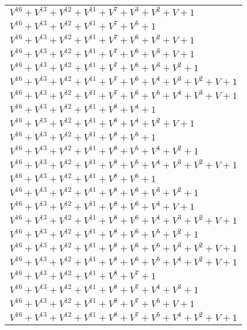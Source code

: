 \documentclass[12pt]{article}
\begin{document}
\begin{adjustwidth}{-4cm}{}
\begin{center}
\begin{longtable}{|l|}
$V^{16}  +V^{13}  +V^{12}  +V^{11}  +V^{7}  +V^{3}  +V^{2}  + V + 1$ \\
$V^{16}  +V^{13}  +V^{12}  +V^{11}  +V^{7}  +V^{5}  + 1$ \\
$V^{16}  +V^{13}  +V^{12}  +V^{11}  +V^{7}  +V^{6}  +V^{2}  + V + 1$ \\
$V^{16}  +V^{13}  +V^{12}  +V^{11}  +V^{7}  +V^{6}  +V^{3}  + V + 1$ \\
$V^{16}  +V^{13}  +V^{12}  +V^{11}  +V^{7}  +V^{6}  +V^{3}  +V^{2}  + 1$ \\
$V^{16}  +V^{13}  +V^{12}  +V^{11}  +V^{7}  +V^{6}  +V^{4}  +V^{3}  +V^{2}  + V + 1$ \\
$V^{16}  +V^{13}  +V^{12}  +V^{11}  +V^{7}  +V^{6}  +V^{5}  +V^{4}  +V^{3}  + V + 1$ \\
$V^{16}  +V^{13}  +V^{12}  +V^{11}  +V^{8}  +V^{4}  + 1$ \\
$V^{16}  +V^{13}  +V^{12}  +V^{11}  +V^{8}  +V^{4}  +V^{2}  + V + 1$ \\
$V^{16}  +V^{13}  +V^{12}  +V^{11}  +V^{8}  +V^{5}  + 1$ \\
$V^{16}  +V^{13}  +V^{12}  +V^{11}  +V^{8}  +V^{5}  +V^{4}  +V^{2}  + 1$ \\
$V^{16}  +V^{13}  +V^{12}  +V^{11}  +V^{8}  +V^{5}  +V^{4}  +V^{3}  +V^{2}  + V + 1$ \\
$V^{16}  +V^{13}  +V^{12}  +V^{11}  +V^{8}  +V^{6}  + 1$ \\
$V^{16}  +V^{13}  +V^{12}  +V^{11}  +V^{8}  +V^{6}  +V^{3}  +V^{2}  + 1$ \\
$V^{16}  +V^{13}  +V^{12}  +V^{11}  +V^{8}  +V^{6}  +V^{4}  + V + 1$ \\
$V^{16}  +V^{13}  +V^{12}  +V^{11}  +V^{8}  +V^{6}  +V^{4}  +V^{3}  +V^{2}  + V + 1$ \\
$V^{16}  +V^{13}  +V^{12}  +V^{11}  +V^{8}  +V^{6}  +V^{5}  +V^{2}  + 1$ \\
$V^{16}  +V^{13}  +V^{12}  +V^{11}  +V^{8}  +V^{6}  +V^{5}  +V^{3}  +V^{2}  + V + 1$ \\
$V^{16}  +V^{13}  +V^{12}  +V^{11}  +V^{8}  +V^{6}  +V^{5}  +V^{4}  +V^{2}  + V + 1$ \\
$V^{16}  +V^{13}  +V^{12}  +V^{11}  +V^{8}  +V^{7}  + 1$ \\
$V^{16}  +V^{13}  +V^{12}  +V^{11}  +V^{8}  +V^{7}  +V^{4}  +V^{3}  + 1$ \\
$V^{16}  +V^{13}  +V^{12}  +V^{11}  +V^{8}  +V^{7}  +V^{5}  + V + 1$ \\
$V^{16}  +V^{13}  +V^{12}  +V^{11}  +V^{8}  +V^{7}  +V^{5}  +V^{4}  +V^{2}  + V + 1$ \\

\end{longtable}
\end{center}
\end{adjustwidth}
\end{document}
